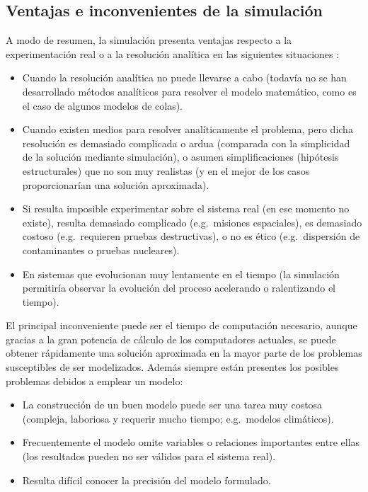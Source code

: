 \documentclass[
  spanish,
  10pt,
]{book}
\theoremstyle{break}
\theoremstyle{nonumberplain}
\begin{document}
\subsection{Ventajas e inconvenientes de la simulación}\label{ventajas-e-inconvenientes-de-la-simulaciuxf3n}

A modo de resumen, la simulación presenta ventajas respecto a la experimentación real o a la resolución analítica en las siguientes situaciones \citep[que coinciden en gran medida con las ya descritas por][]{shannon1975systems}:

\begin{itemize}
\item
  Cuando la resolución analítica no puede llevarse a cabo (todavía no se han desarrollado métodos analíticos para resolver el modelo matemático, como es el caso de algunos modelos de colas).
\item
  Cuando existen medios para resolver analíticamente el problema, pero dicha resolución es demasiado complicada o ardua (comparada con la simplicidad de la solución mediante simulación), o asumen simplificaciones (hipótesis estructurales) que no son muy realistas (y en el mejor de los casos proporcionarían una solución aproximada).
\item
  Si resulta imposible experimentar sobre el sistema real (en ese momento no existe), resulta demasiado complicado (e.g.~misiones espaciales), es demasiado costoso (e.g.~requieren pruebas destructivas), o no es ético (e.g.~dispersión de contaminantes o pruebas nucleares).
\item
  En sistemas que evolucionan muy lentamente en el tiempo (la simulación permitiría observar la evolución del proceso acelerando o ralentizando el tiempo).
\end{itemize}

El principal inconveniente puede ser el tiempo de computación necesario, aunque gracias a la gran potencia de cálculo de los computadores actuales, se puede obtener rápidamente una solución aproximada en la mayor parte de los problemas susceptibles de ser modelizados.
Además siempre están presentes los posibles problemas debidos a emplear un modelo:

\begin{itemize}
\item
  La construcción de un buen modelo puede ser una tarea muy costosa
  (compleja, laboriosa y requerir mucho tiempo;
  e.g.~modelos climáticos).
\item
  Frecuentemente el modelo omite variables o relaciones importantes entre ellas
  (los resultados pueden no ser válidos para el sistema real).
\item
  Resulta difícil conocer la precisión del modelo formulado.
\end{itemize}
\end{document}
